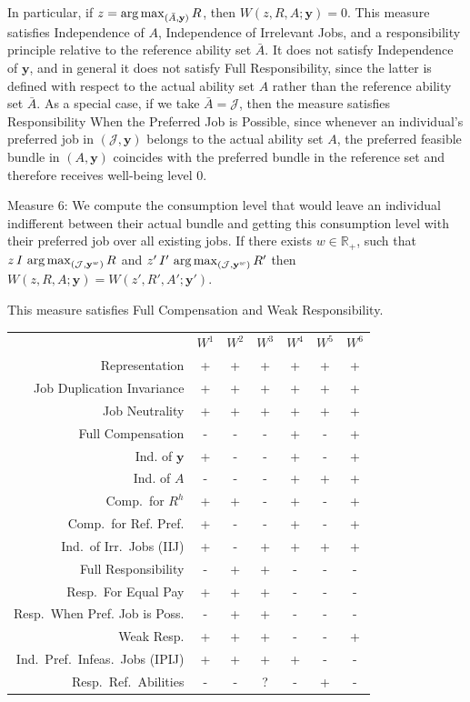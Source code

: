 In particular, if $z=\operatorname*{arg\,max}_{(\bar{A},\mathbf{y})}R$, then $W(z,R,A;\mathbf{y})=0$.
This measure satisfies Independence of $A$, Independence of Irrelevant Jobs, and a responsibility principle relative to the reference ability set $\bar{A}$. It does not satisfy Independence of $\mathbf{y}$, and in general it does not satisfy Full Responsibility, since the latter is defined with respect to the actual ability set $A$ rather than the reference ability set $\bar{A}$.  As a special case, if we take $\bar{A}=\mathcal{J}$, then the measure satisfies Responsibility When the Preferred Job is Possible, since whenever an individual's preferred job in $(\mathcal{J},\mathbf{y})$ belongs to the actual ability set $A$, the preferred feasible bundle in $(A,\mathbf{y})$ coincides with the preferred bundle in the reference set and therefore receives well-being level $0$.


Measure 6: We compute the consumption level that would leave an individual indifferent between their actual bundle and getting this consumption level with their preferred job over all existing jobs. If there exists $w\in\mathbb{R}_{+}$, such that $z\,I\,\operatorname*{arg\,max}_{(\mathcal{J},\mathbf{y}^w)}R$ and $z'\,I'\,\operatorname*{arg\,max}_{(\mathcal{J},\mathbf{y}^w)}R'$ then $W(z,R,A;\mathbf{y})=W(z',R',A';\mathbf{y}')$.

This measure satisfies Full Compensation and Weak Responsibility.\\

\begin{tabular}{r|c|c|c|c|c|c|}
     & $W^1$ & $W^2$ & $W^3$ & $W^4$ & $W^5$ & $W^6$ \\
Representation & + & + & + & + & + & + \\
Job Duplication Invariance & + & + & + & + & + & + \\
Job Neutrality & + & + & + & + & + & + \\
Full Compensation     & - & - & - & + & - & + \\
Ind. of $\mathbf{y}$     & + & - & - & + & - & + \\
Ind. of $A$     & - & - & - & + & + & + \\
Comp.\ for $R^{h}$     & + & + & - & + & - & + \\
Comp.\ for Ref. Pref.     & + & - & - & + & - & + \\
Ind.\ of Irr.\ Jobs (IIJ)     & + & - & + & + & + & + \\
Full Responsibility     & - & + & + & - & - & - \\
Resp.\ For Equal Pay     & + & + & + & - & - & - \\
Resp.\ When Pref. Job is Poss.     & - & + & + & - & - & - \\
Weak Resp.     & + & + & + & - & - & +\\
Ind.\ Pref.\ Infeas.\ Jobs (IPIJ)    & + & + & + & + & - & - \\
Resp.\ Ref.\ Abilities   & - & - & ? & - & + & - \\
\end{tabular}
